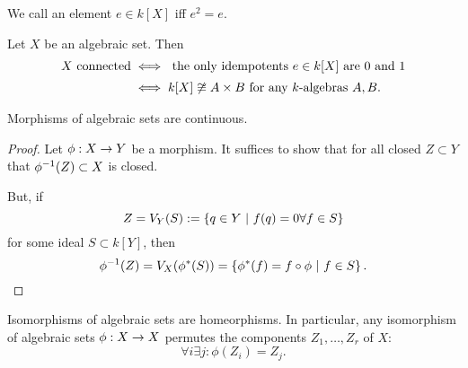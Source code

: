 \begin{lemma}
	We call an element $e \in k[X]$  iff $e^2 = e$.
	
	Let $X$ be an algebraic set. Then
	\begin{align*}
	X \text{ connected} &\iff \text{ the only idempotents }e \in k[X] \text{ are 0 and 1}\\
	&\iff k[X] \not\overset{}{\cong} A \times B \text{ for any }k\text{-algebras }A,B.
	\end{align*}
\end{lemma}
\begin{lemma}
	Morphisms of algebraic sets are continuous.
\end{lemma}
\begin{proof}
	Let $\phi : X \overset{}{\rightarrow} Y$ be a morphism.
	It suffices to show that for all closed $Z \subset Y$ that $\phi^{-1}(Z) \subset X$ is closed.
	
	But, if
	\[Z = V_Y(S) := \left\lbrace q \in Y ~ | ~ f(q) = 0 \forall f \in S\right\rbrace\]
	 for some ideal $S \subset k[Y]$, then 
	 \[\phi^{-1}(Z) = V_X(\phi^*(S)) = \left\lbrace\phi^*(f) = f \circ \phi ~ | ~ f \in S\right\rbrace.\]
\end{proof}
\begin{lemma}
	Isomorphisms of algebraic sets are homeorphisms. In particular, any isomorphism of algebraic sets $\phi : X \overset{}{\rightarrow} X$ permutes the components $Z_1, \ldots, Z_r$ of $X$:
	\[ \forall i \exists j: \phi(Z_i) = Z_j. \]
\end{lemma}

